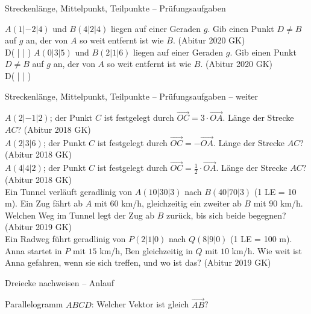 \begin{aufgabe}{Streckenlänge, Mittelpunkt, Teilpunkte – Prüfungsaufgaben}
\begin{teile}
\teil $A(1 | -2 | 4)$ und $B(4 | 2 | 4)$ liegen auf einer Geraden $g$. Gib einen Punkt $D \ne B$ auf $g$ an, der von $A$ so weit entfernt ist wie $B$. \hfill (Abitur 2020 GK) \\ D( \leerfeld | \leerfeld | \leerfeld )
\teil $A(0 | 3 | 5)$ und $B(2 | 1 | 6)$ liegen auf einer Geraden $g$. Gib einen Punkt $D \ne B$ auf $g$ an, der von $A$ so weit entfernt ist wie $B$. \hfill (Abitur 2020 GK) \\ D( \leerfeld | \leerfeld | \leerfeld )
\end{teile}
\end{aufgabe}

\begin{aufgabe}{Streckenlänge, Mittelpunkt, Teilpunkte – Prüfungsaufgaben – weiter}
\begin{teile}
\teil $A(2 | -1 | 2)$; der Punkt $C$ ist festgelegt durch $\overrightarrow{OC} = 3 \cdot \overrightarrow{OA}$. Länge der Strecke $AC$? \hfill (Abitur 2018 GK) \\ \leerfeld
\teil $A(2 | 3 | 6)$; der Punkt $C$ ist festgelegt durch $\overrightarrow{OC} = - \overrightarrow{OA}$. Länge der Strecke $AC$? \hfill (Abitur 2018 GK) \\ \leerfeld
\teil $A(4 | 4 | 2)$; der Punkt $C$ ist festgelegt durch $\overrightarrow{OC} = \frac{1}{2} \cdot \overrightarrow{OA}$. Länge der Strecke $AC$? \hfill (Abitur 2018 GK) \\ \leerfeld
\teil Ein Tunnel verläuft geradlinig von $A(10 | 30 | 3)$ nach $B(40 | 70 | 3)$ (1 LE = 10 m). Ein Zug fährt ab $A$ mit $60$ km/h, gleichzeitig ein zweiter ab $B$ mit $90$ km/h. Welchen Weg im Tunnel legt der Zug ab $B$ zurück, bis sich beide begegnen? \hfill (Abitur 2019 GK) \\ \leerfeld[m]
\teil Ein Radweg führt geradlinig von $P(2 | 1 | 0)$ nach $Q(8 | 9 | 0)$ (1 LE = 100 m). Anna startet in $P$ mit $15$ km/h, Ben gleichzeitig in $Q$ mit $10$ km/h. Wie weit ist Anna gefahren, wenn sie sich treffen, und wo ist das? \hfill (Abitur 2019 GK)
\end{teile}
\end{aufgabe}

\begin{aufgabe}{Dreiecke nachweisen – Anlauf}
\begin{teile}
\teil Parallelogramm $ABCD$: Welcher Vektor ist gleich $\overrightarrow{AB}$? \\  \\  \\ 
\end{teile}
\end{aufgabe}

